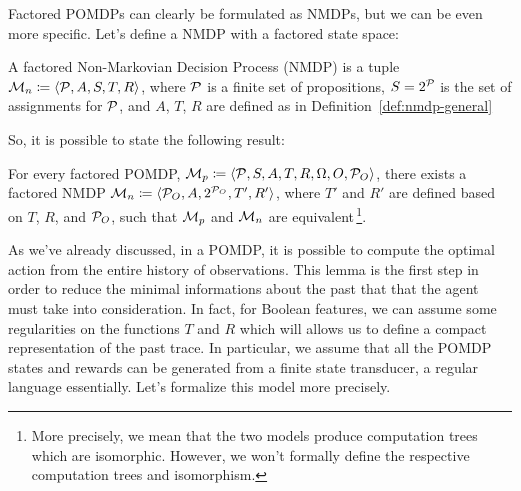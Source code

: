Factored POMDPs can clearly be formulated as NMDPs, but we can be even more
specific. Let's define a NMDP with a factored state space:
\begin{definition}
	A factored Non-Markovian Decision Process (NMDP) is a tuple $\mathcal{M}_n
	\coloneqq \langle \mathcal{P}, A, S, T, R \rangle$, where $\mathcal{P}$ is a
	finite set of propositions, $S = 2^{\mathcal{P}}$ is the set of assignments for
	$\mathcal{P}$, and $A$, $T$, $R$ are defined as in
	Definition~\ref{def:nmdp-general}
	\label{def:nmdp-factored}
\end{definition}
So, it is possible to state the following result:
\begin{lemma}
	\cite{bib:rdp} For every factored POMDP, $\mathcal{M}_p \coloneqq \langle
	\mathcal{P}, S, A, T, R, \Omega, O, \mathcal{P}_O \rangle$, there exists a
	factored NMDP $\mathcal{M}_n \coloneqq \langle \mathcal{P}_O, A,
	2^{\mathcal{P}_O}, T', R' \rangle$, where $T'$ and $R'$ are defined based on
	$T$, $R$, and $\mathcal{P}_O$, such that $\mathcal{M}_p$ and $\mathcal{M}_n$ are
	equivalent\,\footnote{More precisely, we mean that the two models produce
	computation trees which are isomorphic. However, we won't formally define
	the respective computation trees and isomorphism.}.
\end{lemma}

As we've already discussed, in a POMDP, it is possible to compute the optimal
action from the entire history of observations. This lemma is the first step
in order to reduce the minimal informations about the past that that the agent
must take into consideration. In fact, for Boolean features, we can assume
some regularities on the functions $T$ and $R$ which will allows us to define
a compact representation of the past trace. In particular, we assume that all
the POMDP states and rewards can be generated from a finite state transducer,
a regular language essentially. Let's formalize this model more precisely.

